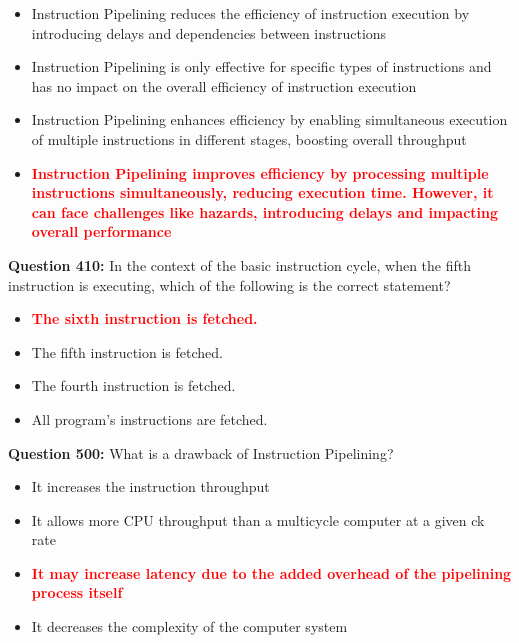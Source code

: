 \documentclass[12pt,a4paper]{article}
\begin{document}
\begin{itemize}
    \item[\textbf{A.}] Instruction Pipelining reduces the efficiency of instruction execution by introducing delays and dependencies between instructions
    \item[\textbf{B.}] Instruction Pipelining is only effective for specific types of instructions and has no impact on the overall efficiency of instruction execution
    \item[\textbf{C.}] Instruction Pipelining enhances efficiency by enabling simultaneous execution of multiple instructions in different stages, boosting overall throughput
    \item[\textbf{D.}] \textcolor{red}{\textbf{Instruction Pipelining improves efficiency by processing multiple instructions simultaneously, reducing execution time. However, it can face challenges like hazards, introducing delays and impacting overall performance}}
\end{itemize}

\vspace{0.5cm}

\vspace{0.5cm}

\textbf{Question 410:} In the context of the basic instruction cycle, when the fifth instruction is executing, which of the following is the correct statement?

\begin{itemize}
    \item[\textbf{A.}] \textcolor{red}{\textbf{The sixth instruction is fetched.}}
    \item[\textbf{B.}] The fifth instruction is fetched.
    \item[\textbf{C.}] The fourth instruction is fetched.
    \item[\textbf{D.}] All program's instructions are fetched.
\end{itemize}

\vspace{0.5cm}

\vspace{0.5cm}

\textbf{Question 500:} What is a drawback of Instruction Pipelining?

\begin{itemize}
    \item[\textbf{A.}] It increases the instruction throughput
    \item[\textbf{B.}] It allows more CPU throughput than a multicycle computer at a given ck rate
    \item[\textbf{C.}] \textcolor{red}{\textbf{It may increase latency due to the added overhead of the pipelining process itself}}
    \item[\textbf{D.}] It decreases the complexity of the computer system
\end{itemize}
\end{document}
